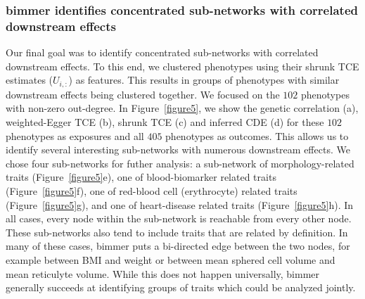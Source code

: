 \documentclass{article}
\begin{document}
\subsubsection*{bimmer identifies concentrated sub-networks with correlated downstream effects}
Our final goal was to identify concentrated sub-networks with correlated downstream effects.
To this end, we clustered phenotypes using their shrunk TCE estimates ($U_{i, :}$) as features.
This results in groups of phenotypes with similar downstream effects being clustered together.
We focused on the $102$ phenotypes with non-zero out-degree.
In Figure~\ref{figure5}, we show the genetic correlation (a), weighted-Egger TCE (b), shrunk TCE (c) and
inferred CDE (d) for these $102$ phenotypes as exposures and all $405$ phenotypes as outcomes. This allows
us to identify several interesting sub-networks with numerous downstream effects. We chose four sub-networks
for futher analysis: a sub-network of morphology-related traits (Figure~\ref{figure5}e),
one of blood-biomarker related traits (Figure~\ref{figure5}f), one of red-blood cell (erythrocyte)
related traits (Figure~\ref{figure5}g), and one of heart-disease related traits (Figure~\ref{figure5}h).
In all cases, every node within the sub-network is reachable from every other node. 
These sub-networks also tend to include traits that are related by definition. In many of these cases,
bimmer puts a bi-directed edge between the two nodes, for example between BMI and weight or
between mean sphered cell volume and mean reticulyte volume. While this does not happen universally,
bimmer generally succeeds at identifying groups of traits which could be analyzed jointly. 
\end{document}
